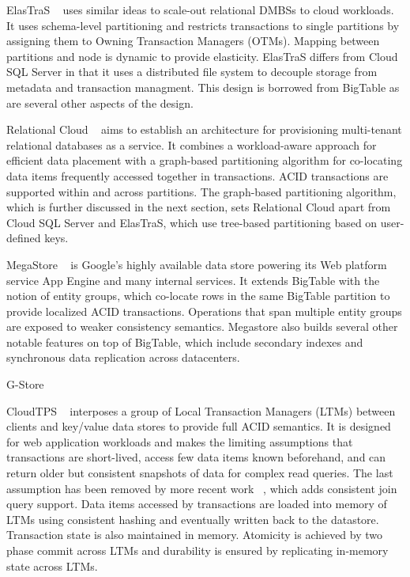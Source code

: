 \documentclass[10pt,final,journal]{IEEEtran}
\begin{document}
ElasTraS ~\cite{Das:2009:EET:1855533.1855540, Das:2010:EAE} uses similar ideas to scale-out relational DMBSs to cloud workloads. It uses schema-level partitioning and restricts transactions to single partitions by assigning them to Owning Transaction Managers (OTMs). Mapping between partitions and node is dynamic to provide elasticity. ElasTraS differs from Cloud SQL Server in that it uses a distributed file system to decouple storage from metadata and transaction managment. This design is borrowed from BigTable as are several other aspects of the design.

Relational Cloud ~\cite{Curino:2011:JPMWMBZ11} aims to establish an architecture for provisioning multi-tenant relational databases as a service. It combines a workload-aware approach for efficient data placement with a graph-based partitioning algorithm for co-locating data items frequently accessed together in transactions. ACID transactions are supported within and across partitions. The graph-based partitioning algorithm, which is further discussed in the next section,  sets Relational Cloud apart from Cloud SQL Server and ElasTraS, which use tree-based partitioning based on user-defined keys.

MegaStore ~\cite{Furman:2008:8530095, Baker:2011:8530095} is Google's highly available data store powering its Web platform service App Engine and many internal services. It extends BigTable with the notion of entity groups, which co-locate rows in the same BigTable partition to provide localized ACID transactions. Operations that span multiple entity groups are exposed to weaker consistency semantics. Megastore also builds several other notable features on top of BigTable, which include secondary indexes and synchronous data replication across datacenters.

G-Store ~\cite{Das:2010:GSD:1807128.1807157} 

CloudTPS ~\cite{Wei:2011:5740834} interposes a group of Local Transaction Managers (LTMs) between clients and key/value data stores to provide full ACID semantics. It is designed for web application workloads and makes the limiting assumptions that transactions are short-lived, access few data items known beforehand, and can return older but consistent snapshots of data for complex read queries. The last assumption has been removed by more recent work ~\cite{Wei:2011:CJQ}, which adds consistent join query support. Data items accessed by transactions are loaded into memory of LTMs using consistent hashing and eventually written back to the datastore. Transaction state is also maintained in memory. Atomicity is achieved by two phase commit across LTMs and durability is ensured by replicating in-memory state across LTMs.
\end{document}
